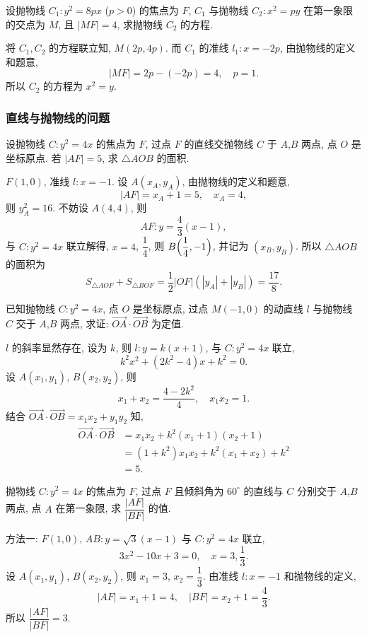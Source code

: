 \lianxi
\begin{exercise}[s]
    设抛物线 $C_1\colon y^2= 8px$ ($p>0$) 的焦点为 $F$, $C_1$ 与抛物线 $C_2\colon x^2= py$ 在第一象限的交点为 $M$, 且 $|MF|= 4$, 求抛物线 $C_2$ 的方程.
\end{exercise}
\beginsolution
    将 $C_1,C_2$ 的方程联立知, $M(2p,4p)$. 而 $C_1$ 的准线 $l_1\colon x= -2p$, 由抛物线的定义和题意,
    \[|MF|= 2p-(-2p)= 4,\quad p=1.\]
    所以 $C_2$ 的方程为 $x^2= y$.
\endsolution

\subsubsection{直线与抛物线的问题}
\begin{example}
    设抛物线 $C\colon y^2 =4x$ 的焦点为 $F$, 过点 $F$ 的直线交抛物线 $C$ 于 $A$,$B$ 两点, 点 $O$ 是坐标原点. 若 $|AF|= 5$, 求 $\triangle AOB$ 的面积.
\end{example}
\beginsolution
    $F(1,0)$, 准线 $l\colon x=-1$. 设 $A(x_A,y_A)$, 由抛物线的定义和题意,
    \[|AF|= x_A+1= 5,\quad x_A= 4,\]
    则 $y_A^2= 16$. 不妨设 $A(4,4)$, 则
    \[AF\colon y= \dfrac43(x-1),\]
    与 $C\colon y^2= 4x$ 联立解得, $x=4$, $\dfrac14$, 则 $B\Bigl(\dfrac14,-1\Bigr)$, 并记为 $(x_B,y_B)$. 所以 $\triangle AOB$ 的面积为
    \[S_{\triangle AOF}+ S_{\triangle BOF}
    = \frac12 |OF|(|y_A|+ |y_B|)= \frac{17}{8}.\]
\endsolution

\begin{example}
    已知抛物线 $C\colon y^2=4x$, 点 $O$ 是坐标原点, 过点 $M(-1,0)$ 的动直线 $l$ 与抛物线 $C$ 交于 $A$,$B$ 两点, 求证: $\overrightarrow{OA}\cdot\overrightarrow{OB}$ 为定值.
\end{example}
\beginsolution
    $l$ 的斜率显然存在, 设为 $k$, 则 $l\colon y= k(x+1)$, 与 $C\colon y^2=4x$ 联立,
    \[k^2x^2+ (2k^2-4)x+ k^2= 0.\]
    设 $A(x_1,y_1)$, $B(x_2,y_2)$, 则
    \[x_1+x_2= \frac{4-2k^2}4,\quad x_1x_2= 1.\]
    结合 $\overrightarrow{OA}\cdot\overrightarrow{OB}= x_1x_2+ y_1y_2$ 知, 
    \[\begin{aligned}
        \overrightarrow{OA}\cdot\overrightarrow{OB}
        &= x_1x_2+ k^2(x_1+1)(x_2+1)\\
        &= (1+k^2)x_1x_2+ k^2(x_1+x_2)+ k^2\\
        &= 5.
    \end{aligned}\]
\endsolution

\lianxi
\begin{exercise}[s]
    抛物线 $C\colon y^2 =4x$ 的焦点为 $F$, 过点 $F$ 且倾斜角为 $60^\circ$ 的直线与 $C$ 分别交于 $A$,$B$ 两点, 点 $A$ 在第一象限, 求 $\dfrac{|AF|}{|BF|}$ 的值.
\end{exercise}
\beginsolution
    方法一: $F(1,0)$, $AB\colon y= \sqrt3(x-1)$ 与 $C\colon y^2 =4x$ 联立,
    \[3x^2- 10x+ 3= 0,\quad x=3,\frac13.\]
    设 $A(x_1,y_1)$, $B(x_2,y_2)$, 则 $x_1= 3$, $x_2= \dfrac13$. 由准线 $l\colon x=-1$ 和抛物线的定义,
    \[|AF|= x_1+1= 4,\quad |BF|= x_2+1= \frac43.\]
    所以 $\dfrac{|AF|}{|BF|}= 3$.

